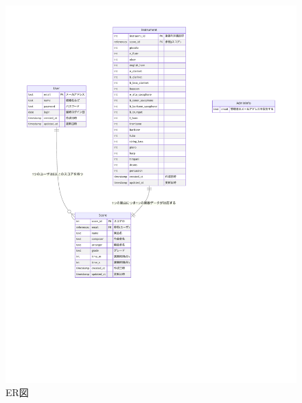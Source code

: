\begin{figure}[p]
	\centering
	\includegraphics[keepaspectratio,width=\textwidth]{db-nwDesign/er.pdf}
	\caption{ER図}
	\label{fig:ER図}
\end{figure}
